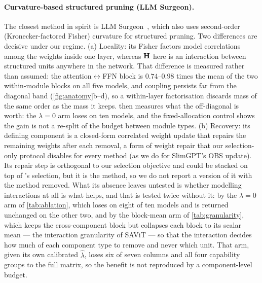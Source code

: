 \paragraph{Curvature-based structured pruning (LLM Surgeon).} The closest method in spirit is LLM
Surgeon~\citep{vanderouderaa2024llmsurgeon}, which also uses second-order (Kronecker-factored Fisher)
curvature for structured pruning. Two differences are decisive under our regime. (a) Locality:
its Fisher factors model correlations among the weights inside one layer, whereas $\mathbf{H}$ here is an
interaction between structured units anywhere in the network. That difference is measured rather than
assumed: the attention$\leftrightarrow$FFN block is $0.74$--$0.98$ times the mean of the two
within-module blocks on all five models, and coupling persists far from the diagonal band
(\cref{fig:anatomy}b--d), so a within-layer factorisation discards mass of the same order as the mass
it keeps.  then measures what the off-diagonal is worth: the $\lambda{=}0$ arm
loses on ten models, and the fixed-allocation control shows the gain is not a re-split of the budget
between module types. (b) Recovery: its
defining component is a closed-form correlated weight update that repairs the remaining weights
after each removal, a form of weight repair that our selection-only protocol disables for every method
(as we do for SlimGPT's OBS update). Its repair step is orthogonal to our selection
objective and could be stacked on top of \method's selection, but it is the method, so we do not
report a version of it with the method removed. What its absence leaves untested is whether modelling
interactions at all is what helps, and that is tested twice without it: by the $\lambda\!=\!0$ arm of
\cref{tab:ablation}, which loses on eight of ten models and is returned unchanged on the other two, and by the block-mean arm of \cref{tab:granularity}, which keeps the
cross-component block but collapses each block to its scalar mean --- the interaction granularity of
SAViT --- so that the interaction decides how much of each component type to remove and never which
unit. That arm, given its own calibrated $\hat\lambda$, loses six of seven columns and all four
capability groups to the full matrix, so the benefit is not reproduced by a component-level budget.

